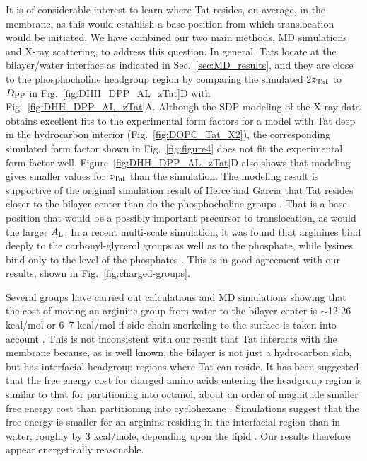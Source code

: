 It is of considerable interest to learn where Tat resides, on average, in the 
membrane, as this would establish a base position from which translocation 
would be initiated. We have combined our two main methods, MD simulations and 
X-ray scattering, to address this question. In general, Tats locate at the 
bilayer/water interface as indicated in Sec.~\ref{sec:MD_results}, 
and they are close to 
the phosphocholine headgroup region by comparing the simulated 2$z_\textrm{Tat}$
to $D_\textrm{PP}$ in Fig.~\ref{fig:DHH_DPP_AL_zTat}D with Fig.~\ref{fig:DHH_DPP_AL_zTat}A. 
Although the SDP modeling of the X-ray data obtains 
excellent fits to the experimental form factors for a model with Tat deep in 
the hydrocarbon interior (Fig.~\ref{fig:DOPC_Tat_X2}), 
the corresponding simulated form factor shown in Fig.~\ref{fig:figure4}
does not fit the experimental form factor well. 
Figure~\ref{fig:DHH_DPP_AL_zTat}D also shows that modeling gives smaller values 
for $z_\textrm{Tat}$ than the simulation. 
The modeling result is supportive of the original simulation result of 
Herce and Garcia that Tat resides closer to the bilayer center than do the 
phosphocholine groups \cite{Herce07}. That is a base position that would be a
possibly important precursor to translocation, as would the larger $A_\textrm{L}$.
In a recent multi-scale simulation, it was found that arginines bind deeply to 
the carbonyl-glycerol groups as well as to the phosphate, while lysines bind 
only to the level of the phosphates \cite{Wu13}.  
This is in good agreement with our results, shown in Fig.~\ref{fig:charged-groups}.

Several groups have carried out calculations and MD simulations showing that 
the cost of moving an arginine group from water to the bilayer center is 
$\sim$12-26 kcal/mol \cite{Johansson09,Li08,Vorobyov08,MacCallum08} 
or 6--7 kcal/mol if side-chain snorkeling to the surface is taken into 
account \cite{Schow11}. This is not inconsistent with our result that Tat 
interacts with the membrane because, as is well known, the bilayer is not
just a hydrocarbon slab, but has interfacial headgroup regions where Tat can 
reside. It has been suggested that the free energy cost for charged amino acids 
entering the headgroup region is similar to that for partitioning into octanol, 
about an order of magnitude smaller free energy cost than partitioning into 
cyclohexane \cite{Wimley96_BC,Wimley96_NSB,Roux07}. 
Simulations suggest that the free energy is smaller for an arginine residing 
in the interfacial region than in water, roughly by 3 kcal/mole, depending
upon the lipid \cite{Johansson09,Roux07}. 
Our results therefore appear energetically reasonable.

